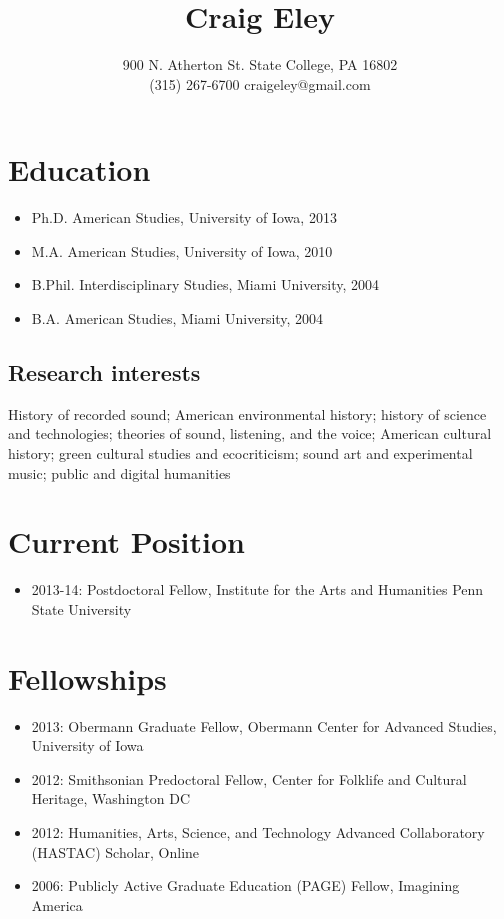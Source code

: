 \documentclass[11pt, a4paper]{article}
\title{Craig Eley} %
\author{900 N. Atherton St. \textbar{} State College, PA 16802\\
(315) 267-6700 \textbar{} craigeley@gmail.com } %
\date{} %
\begin{document}
\maketitle

\section{Education}

\begin{itemize}
\itemsep1pt\parskip0pt
\item
  Ph.D. American Studies, University of Iowa, 2013
\item
  M.A. American Studies, University of Iowa, 2010
\item
  B.Phil. Interdisciplinary Studies, Miami University, 2004
\item
  B.A. American Studies, Miami University, 2004
\end{itemize}

\subsection{Research interests}

History of recorded sound; American environmental history; history of
science and technologies; theories of sound, listening, and the voice;
American cultural history; green cultural studies and ecocriticism;
sound art and experimental music; public and digital humanities

\section{Current Position}

\begin{itemize}
\itemsep1pt\parskip0pt
\item
  2013-14: Postdoctoral Fellow, Institute for the Arts and Humanities
  Penn State University
\end{itemize}

\section{Fellowships}

\begin{itemize}
\itemsep1pt\parskip0pt
\item
  2013: Obermann Graduate Fellow, Obermann Center for Advanced Studies,
  University of Iowa
\item
  2012: Smithsonian Predoctoral Fellow, Center for Folklife and Cultural
  Heritage, Washington DC
\item
  2012: Humanities, Arts, Science, and Technology Advanced Collaboratory
  (HASTAC) Scholar, Online
\item
  2006: Publicly Active Graduate Education (PAGE) Fellow, Imagining
  America
\end{itemize}
\end{document}
